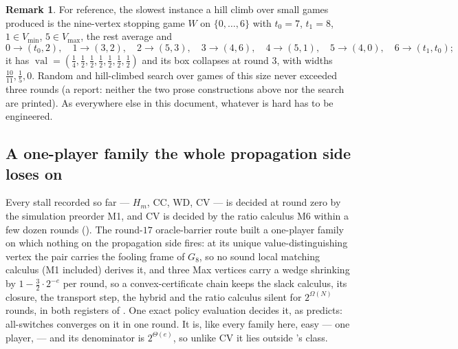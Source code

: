 \documentclass[11pt]{article}
\theoremstyle{plain}
\theoremstyle{definition}
\newtheorem{remark}[theorem]{Remark}
\DeclareMathOperator{\val}{val}
\newcommand{\Vmax}{V_{\max}}
\newcommand{\Vmin}{V_{\min}}
\begin{document}
\begin{remark}
For reference, the slowest instance a hill climb over small games produced is
the nine-vertex stopping game $W$ on $\{0,\dots,6\}$ with $t_0=7$, $t_1=8$,
$1\in\Vmin$, $5\in\Vmax$, the rest average and
\[
  0\to(t_0,2),\quad 1\to(3,2),\quad 2\to(5,3),\quad 3\to(4,6),\quad
  4\to(5,1),\quad 5\to(4,0),\quad 6\to(t_1,t_0);
\]
it has $\val=(\tfrac14,\tfrac12,\tfrac12,\tfrac12,\tfrac12,\tfrac12,\tfrac12)$
and its box collapses at round $3$, with widths $\tfrac{10}{11},\tfrac15,0$.
Random and hill-climbed search over games of this size never exceeded three
rounds (a report: neither the two prose constructions above nor the search
are printed). As everywhere else in this document, whatever is hard has to
be engineered.
\end{remark}


\subsection{A one-player family the whole propagation side loses on}\label{sec:bc}

Every stall recorded so far --- $H_m$, $\mathrm{CC}$, $\mathrm{WD}$,
$\mathrm{CV}$ --- is decided at round zero by the simulation preorder M1,
and $\mathrm{CV}$ is decided by the ratio calculus M6 within a few dozen
rounds (). The round-$17$ oracle-barrier route
built a one-player family on which nothing on the propagation side fires:
at its unique value-distinguishing vertex the pair carries the fooling
frame of $G_8$, so no sound local matching calculus (M1 included) derives
it, and three Max vertices carry a wedge shrinking by $1-\tfrac32\cdot2^{-e}$
per round, so a convex-certificate chain keeps the slack calculus, its
closure, the transport step, the hybrid and the ratio calculus silent for
$2^{\Omega(N)}$ rounds, in both registers of
. One exact policy evaluation decides it,
as  predicts: all-switches converges on it in one
round. It is, like every family here, easy --- one player,
 --- and its denominator is $2^{\Theta(e)}$, so unlike
$\mathrm{CV}$ it lies outside 's class.
\end{document}
